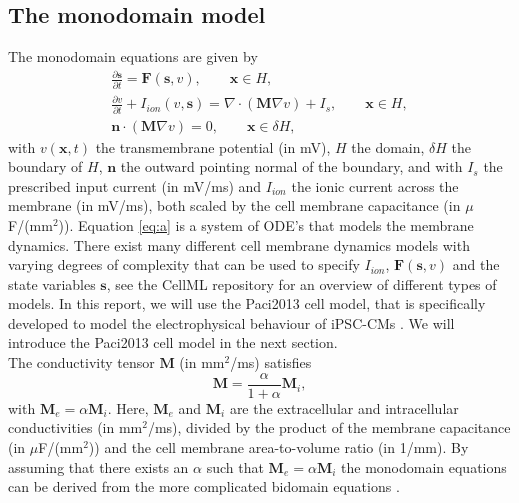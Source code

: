 \documentclass[12pt,a4paper]{article}
\begin{document}
\subsection{The monodomain model} \label{The monodomain model}
The monodomain equations are given by 
\begin{eqnarray} \label{eq:a}
\frac{\partial \mathbf{s}}{\partial t}= \mathbf{F}(\mathbf{s},v), \qquad \mathbf{x} \in H, \\
\frac{\partial v}{\partial t} + I_{ion}(v,\mathbf{s}) =\nabla \label{eq:b} \cdot(\mathbf{M}\nabla v) + I_s,\qquad \mathbf{x} \in H, \\ \label{eq:c}
\mathbf{n}\cdot (\mathbf{M}\nabla v)=0, \qquad \mathbf{x} \in \delta H,
\end{eqnarray}
with $v(\mathbf{x},t)$ the transmembrane potential (in mV), $H$ the domain, $\delta H$ the boundary of $H$, $\mathbf{n}$ the outward pointing normal of the boundary, and with $I_s$ the prescribed input current (in mV/ms) and $I_{ion}$ the ionic current across the membrane (in mV/ms), both scaled by the cell membrane capacitance (in $\mu$F/(mm$^2$)). 
Equation \eqref{eq:a} is a system of ODE's that models the membrane dynamics. There exist many different cell membrane dynamics models with varying degrees of complexity that can be used to specify $I_{ion}$, $\mathbf{F}(\mathbf{s},v)$ and the state variables $\mathbf{s}$, see the CellML repository \cite{cellml} for an overview of different types of models. In this report, we will use the Paci2013 cell model, that is specifically developed to model the electrophysical behaviour of iPSC-CMs \cite{Paci2013}. We will introduce the Paci2013 cell model in the next section.\\ The conductivity tensor $\mathbf{M}$ (in mm$^2$/ms) satisfies 
\begin{equation}
\mathbf{M}=\frac{\alpha}{1+\alpha}\mathbf{M}_i,\label{eq:d}
\end{equation}
with $\mathbf{M}_e=\alpha \mathbf{M}_i$. Here, $\mathbf{M}_e$ and $\mathbf{M}_i$ are the extracellular and intracellular conductivities (in mm$^2$/ms), divided by the product of the membrane capacitance (in $\mu$F/(mm$^2$)) and the cell membrane area-to-volume ratio (in 1/mm). By assuming that there exists an $\alpha$ such that $\mathbf{M}_e=\alpha \mathbf{M}_i$ the monodomain equations can be derived from the more complicated bidomain equations \cite[p. 566-568]{KeenerII}.
%
\end{document}
